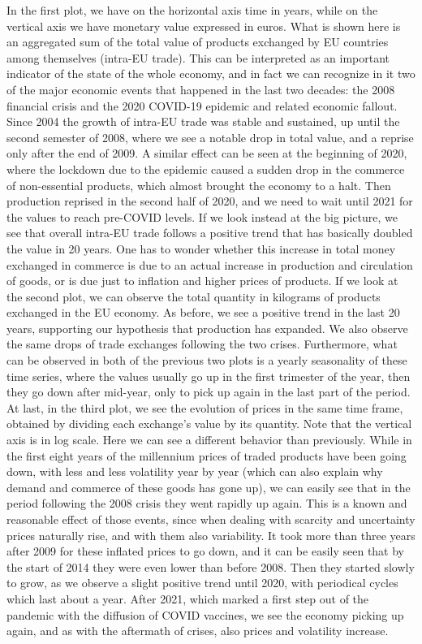 In the first plot, we have on the horizontal axis time in years, while on the vertical axis we have monetary value expressed in euros. What is shown here is an aggregated sum of the total value of products exchanged by EU countries among themselves (intra-EU trade). This can be interpreted as an important indicator of the state of the whole economy, and in fact we can recognize in it two of the major economic events that happened in the last two decades: the 2008 financial crisis and the 2020 COVID-19 epidemic and related economic fallout. Since 2004 the growth of intra-EU trade was stable and sustained, up until the second semester of 2008, where we see a notable drop in total value, and a reprise only after the end of 2009. A similar effect can be seen at the beginning of 2020, where the lockdown due to the epidemic caused a sudden drop in the commerce of non-essential products, which almost brought the economy to a halt. Then production reprised in the second half of 2020, and we need to wait until 2021 for the values to reach pre-COVID levels.
If we look instead at the big picture, we see that overall intra-EU trade follows a positive trend that has basically doubled the value in 20 years. One has to wonder whether this increase in total money exchanged in commerce is due to an actual increase in production and circulation of goods, or is due just to inflation and higher prices of products. If we look at the second plot, we can observe the total quantity in kilograms of products exchanged in the EU economy. As before, we see a positive trend in the last 20 years, supporting our hypothesis that production has expanded. We also observe the same drops of trade exchanges following the two crises. Furthermore, what can be observed in both of the previous two plots is a yearly seasonality of these time series, where the values usually go up in the first trimester of the year, then they go down after mid-year, only to pick up again in the last part of the period. 
At last, in the third plot, we see the evolution of prices in the same time frame, obtained by dividing each exchange's value by its quantity. Note that the vertical axis is in log scale. Here we can see a different behavior than previously. While in the first eight years of the millennium prices of traded products have been going down, with less and less volatility year by year (which can also explain why demand and commerce of these goods has gone up), we can easily see that in the period following the 2008 crisis they went rapidly up again. This is a known and reasonable effect of those events, since when dealing with scarcity and uncertainty prices naturally rise, and with them also variability. It took more than three years after 2009 for these inflated prices to go down, and it can be easily seen that by the start of 2014 they were even lower than before 2008. Then they started slowly to grow, as we observe a  slight positive trend until 2020, with periodical cycles which last about a year. After 2021, which marked a first step out of the pandemic with the diffusion of COVID vaccines, we see the economy picking up again, and as with the aftermath of crises, also prices and volatility increase.

